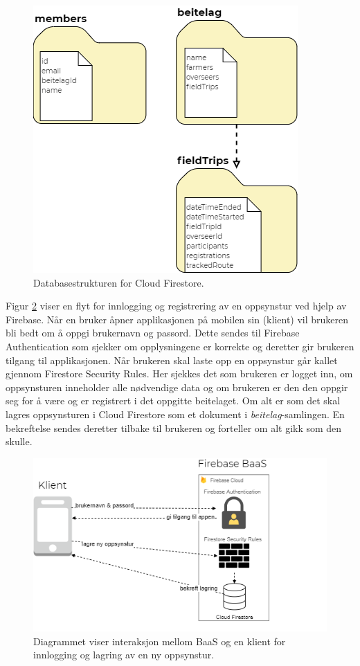 \begin{figure}[H] 
\centering
\captionsetup{width=.8\linewidth}
\includegraphics[scale=0.6]{Figurer/diagram/databasestruktur.png}
\caption{Databasestrukturen for Cloud Firestore.}
\label{fig:databasestruktur}
\end{figure}

\noindent
Figur \ref{fig:firebase_baas} viser en flyt for innlogging og registrering av en oppsynstur ved hjelp av Firebase. Når en bruker åpner applikasjonen på mobilen sin (klient) vil brukeren bli bedt om å oppgi brukernavn og passord. Dette sendes til Firebase Authentication som sjekker om opplysningene er korrekte og deretter gir brukeren tilgang til applikasjonen. Når brukeren skal laste opp en oppsynstur går kallet gjennom Firestore Security Rules. Her sjekkes det som brukeren er logget inn, om oppsynsturen inneholder alle nødvendige data og om brukeren er den den oppgir seg for å være og er registrert i det oppgitte beitelaget. Om alt er som det skal lagres oppsynsturen i Cloud Firestore som et dokument i \textit{beitelag}-samlingen. En bekreftelse sendes deretter tilbake til brukeren og forteller om alt gikk som den skulle.

\begin{figure}[H] 
\centering
\captionsetup{width=.8\linewidth}
\includegraphics[scale=0.8]{Figurer/diagram/firebase_baas.png}
\caption{Diagrammet viser interaksjon mellom BaaS og en klient for innlogging og lagring av en ny oppsynstur.}
\label{fig:firebase_baas}
\end{figure}


